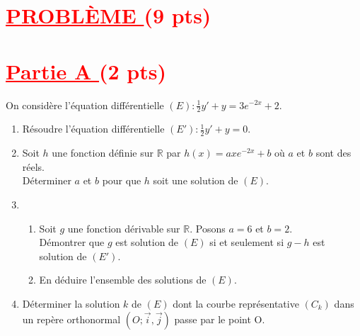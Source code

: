 \documentclass[12pt]{article}
\begin{document}
\section*{\textcolor{red}{\underline{PROBLÈME } (9 pts) }}
\section*{\textcolor{red}{\underline{Partie A }(2 pts)}}
On considère l'équation différentielle $(E):\frac{1}{2}y'+y=3e^{-2x}+2.$

\renewcommand{\labelenumi}{\theenumi)}
\begin{enumerate}[label=\arabic*)]
    \item Résoudre l'équation différentielle $(E'):\frac{1}{2}y'+y=0$.
    \item Soit $h$ une fonction définie sur $\mathbb{R}$ par $h(x)=axe^{-2x}+b$ où $a$ et $b$ sont  des réels.\\
        Déterminer $a$ et $b$ pour que $h$ soit une solution de $(E).$
    \item
    \begin{enumerate}[label=\alph*)]
        \item Soit $g$ une fonction dérivable sur $\mathbb{R}.$ Posons $a=6$ et $b=2.$\\
        Démontrer que $g$ est solution de $(E)$ si et seulement si $g-h$ est solution  de $(E').$
        \item En déduire l'ensemble des solutions de $(E)$.
    \end{enumerate}
    \item Déterminer la solution $k$ de $(E)$ dont la courbe représentative $(C_{k})$ dans un repère orthonormal $(O;\vec{i},\vec{j})$ passe par le point O.
\end{enumerate}
\end{document}
